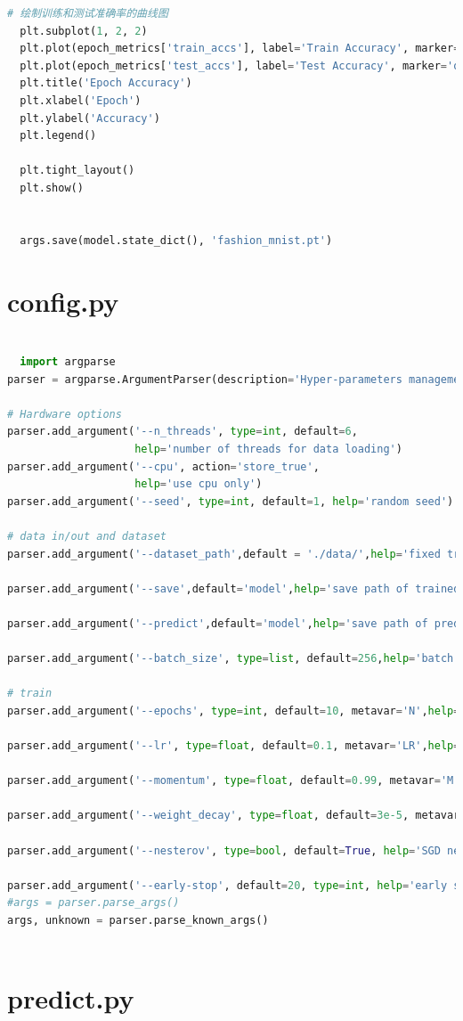 \documentclass[12pt]{article}
\begin{document}
\begin{lstlisting}[language=Python]
  # 绘制训练和测试准确率的曲线图
  plt.subplot(1, 2, 2)
  plt.plot(epoch_metrics['train_accs'], label='Train Accuracy', marker='o')
  plt.plot(epoch_metrics['test_accs'], label='Test Accuracy', marker='o')
  plt.title('Epoch Accuracy')
  plt.xlabel('Epoch')
  plt.ylabel('Accuracy')
  plt.legend()
  
  plt.tight_layout()
  plt.show()
  
  
  args.save(model.state_dict(), 'fashion_mnist.pt')

\end{lstlisting}


\section{config.py}
\begin{lstlisting}[language=Python]

  import argparse
parser = argparse.ArgumentParser(description='Hyper-parameters management')

# Hardware options
parser.add_argument('--n_threads', type=int, default=6,
                    help='number of threads for data loading')
parser.add_argument('--cpu', action='store_true',
                    help='use cpu only')
parser.add_argument('--seed', type=int, default=1, help='random seed')

# data in/out and dataset
parser.add_argument('--dataset_path',default = './data/',help='fixed trainset root path')

parser.add_argument('--save',default='model',help='save path of trained model')

parser.add_argument('--predict',default='model',help='save path of predict model')

parser.add_argument('--batch_size', type=list, default=256,help='batch size of trainset')

# train
parser.add_argument('--epochs', type=int, default=10, metavar='N',help='number of epochs to train (default: 10)')

parser.add_argument('--lr', type=float, default=0.1, metavar='LR',help='learning rate (default: 0.01)')

parser.add_argument('--momentum', type=float, default=0.99, metavar='M',help='SGD momentum (default: 0.5)')

parser.add_argument('--weight_decay', type=float, default=3e-5, metavar='W',help='SGD weight_decay (default: 3e-5)')

parser.add_argument('--nesterov', type=bool, default=True, help='SGD nesterov (default: True)')

parser.add_argument('--early-stop', default=20, type=int, help='early stopping (default: 20)')
#args = parser.parse_args()
args, unknown = parser.parse_known_args()
  

\end{lstlisting}


\section{predict.py}
\end{document}
